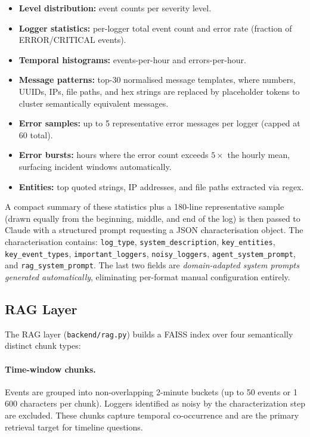 \documentclass[runningheads]{llncs}
\begin{document}
\begin{itemize}
  \item \textbf{Level distribution:} event counts per severity level.
  \item \textbf{Logger statistics:} per-logger total event count and
        error rate (fraction of ERROR/CRITICAL events).
  \item \textbf{Temporal histograms:} events-per-hour and errors-per-hour.
  \item \textbf{Message patterns:} top-30 normalised message templates,
        where numbers, UUIDs, IPs, file paths, and hex strings are replaced
        by placeholder tokens to cluster semantically equivalent messages.
  \item \textbf{Error samples:} up to 5 representative error messages per
        logger (capped at 60 total).
  \item \textbf{Error bursts:} hours where the error count exceeds
        $5\times$ the hourly mean, surfacing incident windows automatically.
  \item \textbf{Entities:} top quoted strings, IP addresses, and file paths
        extracted via regex.
\end{itemize}

A compact summary of these statistics plus a 180-line representative sample
(drawn equally from the beginning, middle, and end of the log) is then passed
to Claude with a structured prompt requesting a JSON characterisation object.
The characterisation contains: \texttt{log\_type}, \texttt{system\_description},
\texttt{key\_entities}, \texttt{key\_event\_types},
\texttt{important\_loggers}, \texttt{noisy\_loggers},
\texttt{agent\_system\_prompt}, and \texttt{rag\_system\_prompt}. The last two
fields are \emph{domain-adapted system prompts generated automatically},
eliminating per-format manual configuration entirely.

\subsection{RAG Layer}
\label{ssec:rag}

The RAG layer (\texttt{backend/rag.py}) builds a FAISS index over four
semantically distinct chunk types:

\paragraph{Time-window chunks.}
Events are grouped into non-overlapping 2-minute buckets (up to 50 events or
1\,600 characters per chunk). Loggers identified as noisy by the
characterization step are excluded. These chunks capture temporal
co-occurrence and are the primary retrieval target for timeline questions.
\end{document}
